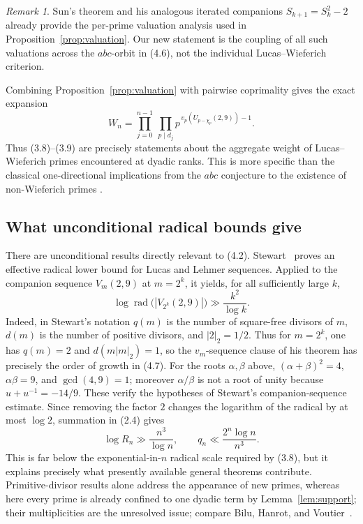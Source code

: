 \documentclass[11pt]{article}
\theoremstyle{remark}
\newtheorem{remark}[theorem]{Remark}
\newcommand{\rad}{\operatorname{rad}}
\begin{document}
\begin{remark}
Sun's theorem and his analogous iterated companions
\(S_{k+1}=S_k^2-2\) already provide the per-prime valuation analysis
used in Proposition~\ref{prop:valuation}.  Our new statement is the
coupling of all such valuations across the \(abc\)-orbit in (4.6), not
the individual Lucas--Wieferich criterion.
\end{remark}

Combining Proposition~\ref{prop:valuation} with pairwise coprimality
gives the exact expansion
\[
 \boxed{\quad
 W_n=\prod_{j=0}^{n-1}\ \prod_{p\mid d_j}
 p^{\,v_p(U_{p-\chi_p}(2,9))-1}.
 \quad}                                                    \tag{4.6}
\]
Thus (3.8)--(3.9) are precisely statements about the aggregate weight of
Lucas--Wieferich primes encountered at dyadic ranks.  This is more
specific than the classical one-directional implications from the
\(abc\) conjecture to the existence of non-Wieferich primes
\cite{Silverman1988,RibenboimWalsh1999,Yabuta2007}.

\subsection{What unconditional radical bounds give}

There are unconditional results directly relevant to (4.2).
Stewart~\cite[Theorem~1]{Stewart1983} proves an effective radical lower
bound for Lucas and Lehmer sequences.  Applied to the companion sequence
\(V_m(2,9)\) at \(m=2^k\), it yields, for all sufficiently large \(k\),
\[
 \log\rad\bigl(|V_{2^k}(2,9)|\bigr)
 \gg \frac{k^2}{\log k}.                                  \tag{4.7}
\]
Indeed, in Stewart's notation \(q(m)\) is the number of square-free
divisors of \(m\), \(d(m)\) is the number of positive divisors, and
\(|2|_2=1/2\).  Thus for \(m=2^k\), one has \(q(m)=2\) and
\(d(m|m|_2)=1\), so the \(v_m\)-sequence clause of his theorem has
precisely the order of growth in (4.7).
For the roots \(\alpha,\beta\) above,
\((\alpha+\beta)^2=4\), \(\alpha\beta=9\), and
\(\gcd(4,9)=1\); moreover \(\alpha/\beta\) is not a root of unity
because \(u+u^{-1}=-14/9\).  These verify the hypotheses of Stewart's
companion-sequence estimate.
Since removing the factor \(2\) changes the logarithm of the radical by
at most \(\log2\), summation in (2.4) gives
\[
 \log R_n\gg\frac{n^3}{\log n},\qquad
 q_n\ll\frac{2^n\log n}{n^3}.                             \tag{4.8}
\]
This is far below the exponential-in-\(n\) radical scale required by
(3.8), but it explains precisely what presently available general
theorems contribute.  Primitive-divisor results alone address the
appearance of new primes, whereas here every prime is already confined
to one dyadic term by Lemma~\ref{lem:support}; their multiplicities are
the unresolved issue; compare Bilu, Hanrot, and
Voutier~\cite{BiluHanrotVoutier2001}.
\end{document}

